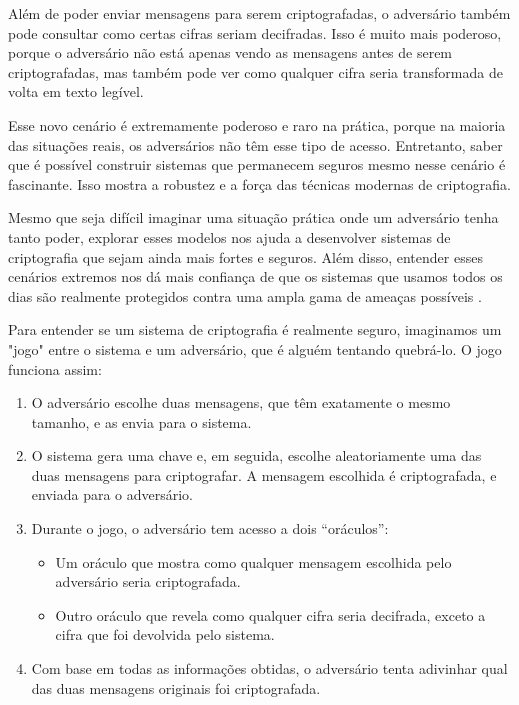Além de poder enviar mensagens para serem criptografadas, o adversário também pode consultar como certas cifras seriam decifradas.
Isso é muito mais poderoso, porque o adversário não está apenas vendo as mensagens antes de serem criptografadas, mas também pode ver como qualquer cifra seria transformada de volta em texto legível.

Esse novo cenário é extremamente poderoso e raro na prática, porque na maioria das situações reais, os adversários não têm esse tipo de acesso. Entretanto, saber que é possível construir sistemas que permanecem seguros mesmo nesse cenário é fascinante. Isso mostra a robustez e a força das técnicas modernas de criptografia.

Mesmo que seja difícil imaginar uma situação prática onde um adversário tenha tanto poder, explorar esses modelos nos ajuda a desenvolver sistemas de criptografia que sejam ainda mais fortes e seguros.
Além disso, entender esses cenários extremos nos dá mais confiança de que os sistemas que usamos todos os dias são realmente protegidos contra uma ampla gama de ameaças possíveis \cite{Naor90}.

Para entender se um sistema de criptografia é realmente seguro, imaginamos um "jogo" entre o sistema e um adversário, que é alguém tentando quebrá-lo.
O jogo funciona assim:
\begin{enumerate}
\item O adversário escolhe duas mensagens, que têm exatamente o mesmo tamanho, e as envia para o sistema.
\item O sistema gera uma chave e, em seguida, escolhe aleatoriamente uma das duas mensagens para criptografar.
  A mensagem escolhida é criptografada, e enviada para o adversário.
\item Durante o jogo, o adversário tem acesso a dois ``oráculos'':
  \begin{itemize}
  \item Um oráculo que mostra como qualquer mensagem escolhida pelo adversário seria criptografada.
  \item Outro oráculo que revela como qualquer cifra seria decifrada, exceto a cifra que foi devolvida pelo sistema.
  \end{itemize}
\item Com base em todas as informações obtidas, o adversário tenta adivinhar qual das duas mensagens originais foi criptografada.
\end{enumerate}

